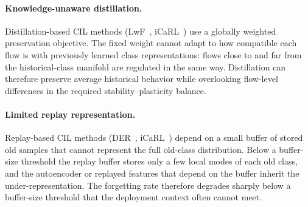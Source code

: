 \paragraph{Knowledge-unaware distillation.}
Distillation-based CIL methods (LwF~\cite{li2017lwf}, iCaRL~\cite{rebuffi2017icarl}) use a globally weighted preservation objective. The fixed weight cannot adapt to how compatible each flow is with previously learned class representations: flows close to and far from the historical-class manifold are regulated in the same way. Distillation can therefore preserve average historical behavior while overlooking flow-level differences in the required stability--plasticity balance.

\paragraph{Limited replay representation.}
Replay-based CIL methods (DER~\cite{yan2021der}, iCaRL~\cite{rebuffi2017icarl}) depend on a small buffer of stored old samples that cannot represent the full old-class distribution. Below a buffer-size threshold the replay buffer stores only a few local modes of each old class, and the autoencoder or replayed features that depend on the buffer inherit the under-representation. The forgetting rate therefore degrades sharply below a buffer-size threshold that the deployment context often cannot meet.
